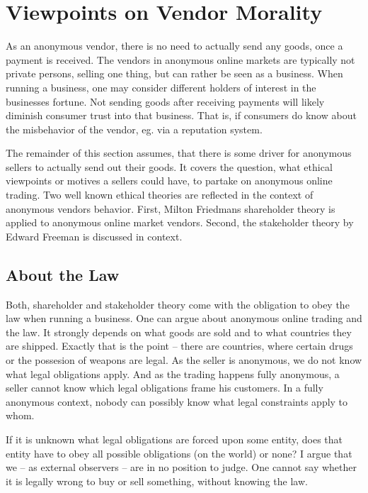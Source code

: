 \section{Viewpoints on Vendor Morality}
\label{vendors}

As an anonymous vendor, there is no need to actually send any goods, once a payment is received. The vendors in anonymous online markets are typically not private persons, selling one thing, but can rather be seen as a business\cite{silkroad2013}. When running a business, one may consider different holders of interest in the businesses fortune. Not sending goods after receiving payments will likely diminish consumer trust into that business. That is, if consumers do know about the misbehavior of the vendor, eg. via a reputation system.

The remainder of this section assumes, that there is some driver for anonymous sellers to actually send out their goods. It covers the question, what ethical viewpoints or motives a sellers could have, to partake on anonymous online trading. Two well known ethical theories are reflected in the context of anonymous vendors behavior. First, Milton Friedmans shareholder theory is applied to anonymous online market vendors. Second, the stakeholder theory by Edward Freeman is discussed in context.

\subsection{About the Law}

Both, shareholder and stakeholder theory come with the obligation to obey the law when running a business\cite{shareholder, stakeholder}. One can argue about anonymous online trading and the law. It strongly depends on what goods are sold and to what countries they are shipped. Exactly that is the point -- there are countries, where certain drugs or the possesion of weapons are legal. As the seller is anonymous, we do not know what legal obligations apply. And as the trading happens fully anonymous, a seller cannot know which legal obligations frame his customers. In a fully anonymous context, nobody can possibly know what legal constraints apply to whom.

If it is unknown what legal obligations are forced upon some entity, does that entity have to obey all possible obligations (on the world) or none? I argue that we -- as external observers -- are in no position to judge. One cannot say whether it is legally wrong to buy or sell something, without knowing the law.

